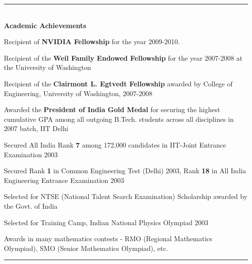 \documentclass[11pt]{article}
\newenvironment{itemize*}%
  {\begin{itemize}%
    \setlength{\itemsep}{0pt}%
    \setlength{\parskip}{0pt}%
	}
  {\end{itemize}}
\begin{document}
\rule{\textwidth}{2pt}
\\
\vspace{0.10in}
{\large \textbf{Academic Achievements}}
\begin{itemize*}
\item Recipient of \textbf{NVIDIA Fellowship} for the year 2009-2010.
\item Recipient of the \textbf{Weil Family Endowed Fellowship} for the year 2007-2008 at the University of Washington
\item Recipient of the \textbf{Clairmont L. Egtvedt Fellowship} awarded by College of Engineering, University of Washington, 2007-2008
\item Awarded  the \textbf{President of India Gold Medal} for securing the highest cumulative GPA among all outgoing B.Tech. students  across all disciplines in 2007 batch, IIT Delhi
\item Secured All India Rank \textbf{7} among 172,000 candidates in IIT-Joint Entrance Examination 2003
\item Secured Rank \textbf{1} in Common Engineering Test (Delhi) 2003, Rank \textbf{18} in All India Engineering Entrance Examination 2003
\item Selected for NTSE (National Talent Search Examination) Scholarship awarded by the Govt. of India
\item Selected for Training Camp, Indian  National Physics Olympiad 2003
\item Awards in many mathematics contests - RMO (Regional Mathematics Olympiad), SMO (Senior Mathematics Olympiad), etc.
\end{itemize*}
\rule{\textwidth}{2pt}
\\
\vspace{0.10in}
\end{document}
